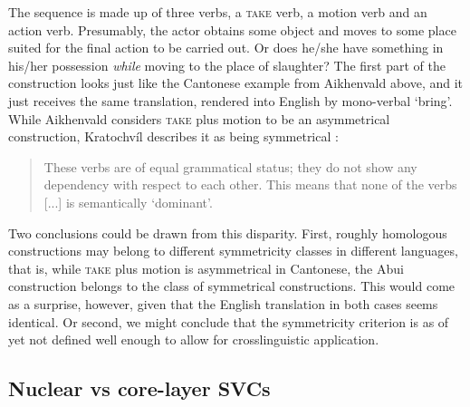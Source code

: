 The sequence is made up of three verbs, a \textsc{take} verb, a motion verb and an action verb. Presumably, the actor obtains some object and moves to some place suited for the final action to be carried out. Or does he/she have something in his/her possession \textit{while} moving to the place of slaughter? The first part of the construction looks just like the Cantonese example from Aikhenvald above, and it just receives the same translation, rendered into English by mono-verbal `bring'. While Aikhenvald considers \textsc{take} plus motion to be an asymmetrical construction, Kratochvíl describes it as being symmetrical \citep[351]{kratochvil2007grammar}:

\begin{quote}These verbs are of equal grammatical status; they do not show any dependency with respect to each other. This means that none of the verbs [...] is semantically `dominant'.\end{quote}

Two conclusions could be drawn from this disparity. First, roughly homologous constructions may belong to different symmetricity classes in different languages, that is, while \textsc{take} plus motion is asymmetrical in Cantonese, the Abui construction belongs to the class of symmetrical constructions. This would come as a surprise, however, given that the English translation in both cases seems identical. Or second, we might conclude that the symmetricity criterion is as of yet not defined well enough to allow for crosslinguistic application. 

\subsection{Nuclear vs core-layer SVCs}\label{sec:nuclear}

